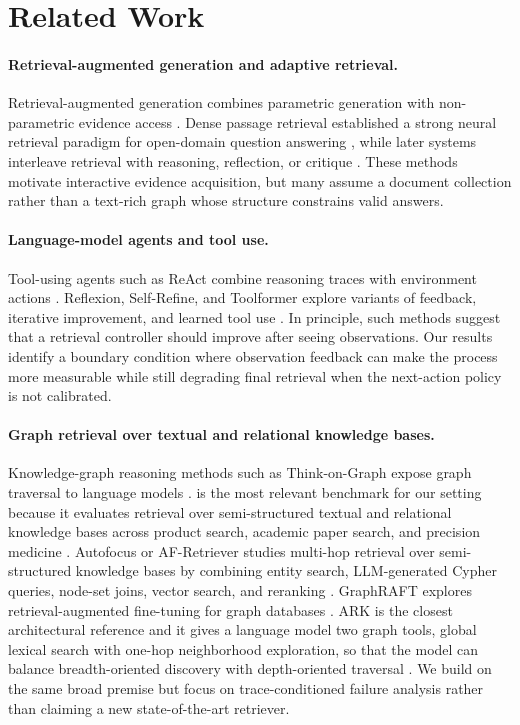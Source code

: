 \section{Related Work}
\paragraph{Retrieval-augmented generation and adaptive retrieval.}
Retrieval-augmented generation combines parametric generation with non-parametric evidence access \citep{lewis2020rag}. Dense passage retrieval established a strong neural retrieval paradigm for open-domain question answering \citep{karpukhin2020dpr}, while later systems interleave retrieval with reasoning, reflection, or critique \citep{trivedi2023interleaving,asai2024selfrag}. These methods motivate interactive evidence acquisition, but many assume a document collection rather than a text-rich graph whose structure constrains valid answers.

\paragraph{Language-model agents and tool use.}
Tool-using agents such as ReAct combine reasoning traces with environment actions \citep{yao2023react}. Reflexion, Self-Refine, and Toolformer explore variants of feedback, iterative improvement, and learned tool use \citep{shinn2023reflexion,madaan2023selfrefine,schick2023toolformer}. In principle, such methods suggest that a retrieval controller should improve after seeing observations. Our results identify a boundary condition where observation feedback can make the process more measurable while still degrading final retrieval when the next-action policy is not calibrated.

\paragraph{Graph retrieval over textual and relational knowledge bases.}
Knowledge-graph reasoning methods such as Think-on-Graph expose graph traversal to language models \citep{sun2023thinkongraph}. \stark is the most relevant benchmark for our setting because it evaluates retrieval over semi-structured textual and relational knowledge bases across product search, academic paper search, and precision medicine \citep{wu2024stark}. Autofocus or AF-Retriever studies multi-hop retrieval over semi-structured knowledge bases by combining entity search, LLM-generated Cypher queries, node-set joins, vector search, and reranking \citep{boer2025afretriever}. GraphRAFT explores retrieval-augmented fine-tuning for graph databases \citep{clemedtson2025graphraft}. ARK is the closest architectural reference and it gives a language model two graph tools, global lexical search with one-hop neighborhood exploration, so that the model can balance breadth-oriented discovery with depth-oriented traversal \citep{polonuer2026ark}. We build on the same broad premise but focus on trace-conditioned failure analysis rather than claiming a new state-of-the-art retriever.

